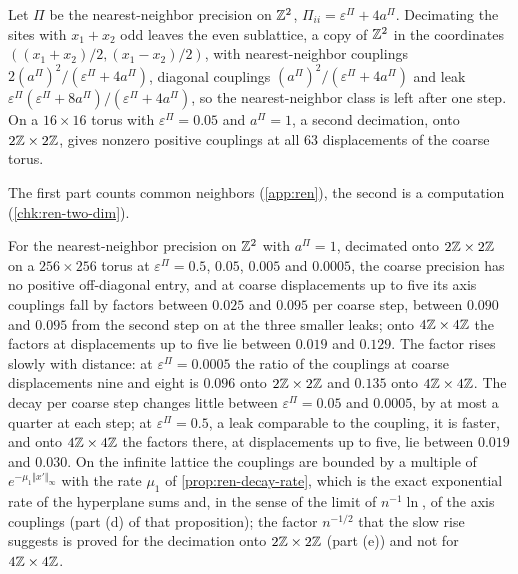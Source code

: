 \begin{example}\label{ex:ren-two-dim}
Let $\Pi$ be the nearest-neighbor precision on $\mathbb{Z}^2$, $\Pi_{ii}=\varepsilon^\Pi+4a^\Pi$. Decimating the sites with $x_1+x_2$ odd leaves the even sublattice, a copy of $\mathbb{Z}^2$ in the coordinates $((x_1+x_2)/2,(x_1-x_2)/2)$, with nearest-neighbor couplings $2(a^\Pi)^2/(\varepsilon^\Pi+4a^\Pi)$, diagonal couplings $(a^\Pi)^2/(\varepsilon^\Pi+4a^\Pi)$ and leak $\varepsilon^\Pi(\varepsilon^\Pi+8a^\Pi)/(\varepsilon^\Pi+4a^\Pi)$, so the nearest-neighbor class is left after one step. On a $16\times16$ torus with $\varepsilon^\Pi=0.05$ and $a^\Pi=1$, a second decimation, onto $2\mathbb{Z}\times2\mathbb{Z}$, gives nonzero positive couplings at all $63$ displacements of the coarse torus.
\end{example}
The first part counts common neighbors (\cref{app:ren}), the second is a computation (\cref{chk:ren-two-dim}).

\begin{observation}\label{obs:ren-decay}
For the nearest-neighbor precision on $\mathbb{Z}^2$ with $a^\Pi=1$, decimated onto $2\mathbb{Z}\times2\mathbb{Z}$ on a $256\times256$ torus at $\varepsilon^\Pi=0.5$, $0.05$, $0.005$ and $0.0005$, the coarse precision has no positive off-diagonal entry, and at coarse displacements up to five its axis couplings fall by factors between $0.025$ and $0.095$ per coarse step, between $0.090$ and $0.095$ from the second step on at the three smaller leaks; onto $4\mathbb{Z}\times4\mathbb{Z}$ the factors at displacements up to five lie between $0.019$ and $0.129$. The factor rises slowly with distance: at $\varepsilon^\Pi=0.0005$ the ratio of the couplings at coarse displacements nine and eight is $0.096$ onto $2\mathbb{Z}\times2\mathbb{Z}$ and $0.135$ onto $4\mathbb{Z}\times4\mathbb{Z}$. The decay per coarse step changes little between $\varepsilon^\Pi=0.05$ and $0.0005$, by at most a quarter at each step; at $\varepsilon^\Pi=0.5$, a leak comparable to the coupling, it is faster, and onto $4\mathbb{Z}\times4\mathbb{Z}$ the factors there, at displacements up to five, lie between $0.019$ and $0.030$. On the infinite lattice the couplings are bounded by a multiple of $e^{-\mu_1\Vert x'\Vert_\infty}$ with the rate $\mu_1$ of \cref{prop:ren-decay-rate}, which is the exact exponential rate of the hyperplane sums and, in the sense of the limit of $n^{-1}\ln$, of the axis couplings (part (d) of that proposition); the factor $n^{-1/2}$ that the slow rise suggests is proved for the decimation onto $2\mathbb{Z}\times2\mathbb{Z}$ (part (e)) and not for $4\mathbb{Z}\times4\mathbb{Z}$.
\end{observation}

